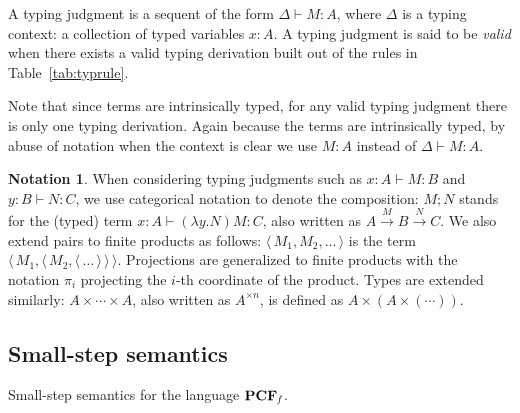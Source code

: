 \documentclass[10pt]{article}
\theoremstyle{plain}
\theoremstyle{definition}
\newtheorem{notation}[theorem]{Notation}
\newcommand{\entail}{\vdash}
\newcommand{\pair}[1]{{\langle\,{#1}\,\rangle}}
\newcommand{\ttrue}{{\tt t}\!{\tt t}}
\newcommand{\ffalse}{{\tt f}\!{\tt f}}
\newcommand{\ifterm}[3]{{{\tt if}\,{#1}\,{\tt then}\,{#2}\,{\tt else}\,{#3}}}
\newcommand{\letunit}[2]{{\tt let}\,\star={#1}\,{\tt in}\,{#2}}
\begin{document}
A typing judgment is a sequent of the form $\Delta\entail M:A$, where
$\Delta$ is a typing context: a collection of typed variables $x:A$. A
typing judgment is said to be {\em valid} when there exists a valid typing
derivation built out of the rules in Table~\ref{tab:typrule}.

Note that since terms are intrinsically typed, for any valid typing
judgment there is only one typing derivation. Again because the terms
are intrinsically typed, by abuse of notation when the context is clear
we use $M:A$ instead of $\Delta\entail M:A$.

\begin{notation}
  When considering typing judgments such as $x:A\entail M:B$ and
  $y:B\entail N:C$, we use categorical notation to denote the
  composition: $M;N$ stands for the (typed) term $x:A\entail(\lambda
  y.N)M:C$, also
  written as $A\xrightarrow{M}B\xrightarrow{N}C$.
We also extend pairs to finite
  products as follows: $\pair{M_1,M_2,\ldots}$ is the term
  $\pair{M_1,\pair{M_2,\pair{\ldots}}}$. Projections are generalized
  to finite products with the notation $\pi_i$ projecting the $i$-th
  coordinate of the product. Types are extended similarly:
  $A\times\cdots\times A$, also written as $A^{\times n}$, is defined
  as $A\times (A\times (\cdots))$. 
\end{notation}


\subsection{Small-step semantics}


\begin{table*}[b]
  \caption{Small-step semantics for the language ${\bf PCF}_{\it f}$.}
  \label{tab:cbn}
  \scalebox{.865}{\begin{minipage}{5.5in}
  \[
  \begin{array}{rcl}
    (\lambda x.M)N &\to& M[N/x]
    \\
    \letunit{\star}{M}&\to& M
  \end{array}
  \quad
  \begin{array}{rcl}
    \pi_l\pair{M,N}  &\to& M
    \\
    \pi_r\pair{M,N}  &\to& N
  \end{array}
  \quad
  \begin{array}{rcl}
    \ifterm{\ttrue}{M}{N} &\to& M
    \\
    \ifterm{\ffalse}{M}{N} &\to& N
  \end{array}
  \]
  \[
  \infer{MN\to M'N}{M\to M'}
  \qquad
  \infer{\pi_l(M)\to \pi_l(M')}{M\to M'}
  \qquad
  \infer{\pi_r(M)\to \pi_r(M')}{M\to M'}
  \]
  \[
  \infer{\ifterm{M}{N_1}{N_2}\to \ifterm{M'}{N_1}{N_2}}{M\to M'}
  ~~
  \infer{\letunit{M}{N}\to\letunit{M'}{N}}{M\to M'}
  \]
  \end{minipage}}
\end{table*}
\end{document}
